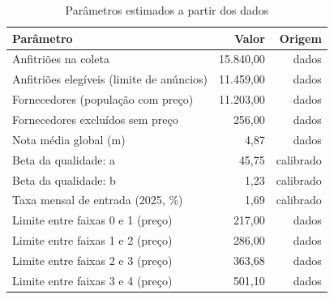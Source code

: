 \begin{table}[ht]
\centering
\caption{Parâmetros estimados a partir dos dados}
\label{tab:parametros_calibrados}
\begin{tabular}{lrr}
\hline
\textbf{Parâmetro} & \textbf{Valor} & \textbf{Origem} \\
\hline
Anfitriões na coleta & 15.840,00 & dados \\
Anfitriões elegíveis (limite de anúncios) & 11.459,00 & dados \\
Fornecedores (população com preço) & 11.203,00 & dados \\
Fornecedores excluídos sem preço & 256,00 & dados \\
Nota média global (m) & 4,87 & dados \\
Beta da qualidade: a & 45,75 & calibrado \\
Beta da qualidade: b & 1,23 & calibrado \\
Taxa mensal de entrada (2025, \%) & 1,69 & calibrado \\
Limite entre faixas 0 e 1 (preço) & 217,00 & dados \\
Limite entre faixas 1 e 2 (preço) & 286,00 & dados \\
Limite entre faixas 2 e 3 (preço) & 363,68 & dados \\
Limite entre faixas 3 e 4 (preço) & 501,10 & dados \\
\hline
\end{tabular}
\end{table}
